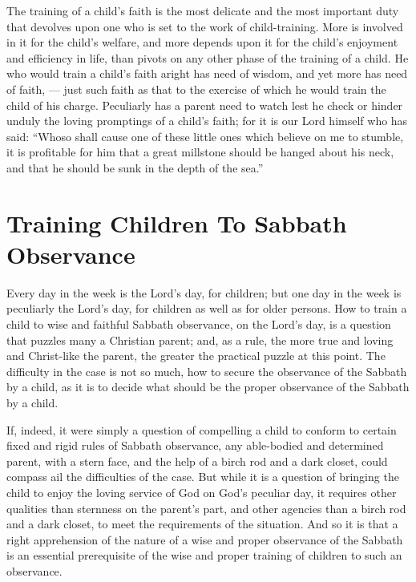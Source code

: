 \documentclass[
]{book}
\begin{document}
The training of a child's faith is the most delicate and the most important duty that devolves upon one who is set to the work of child-training. More is involved in it for the child's welfare, and more depends upon it for the child's enjoyment and efficiency in life, than pivots on any other phase of the training of a child. He who would train a child's faith aright has need of wisdom, and yet more has need of faith, --- just such faith as that to the exercise of which he would train the child of his charge. Peculiarly has a parent need to watch lest he check or hinder unduly the loving promptings of a child's faith; for it is our Lord himself who has said: ``Whoso shall cause one of these little ones which believe on me to stumble, it is profitable for him that a great millstone should be hanged about his neck, and that he should be sunk in the depth of the sea.''

\hypertarget{training-children-to-sabbath-observance}{%
\chapter{Training Children To Sabbath Observance}\label{training-children-to-sabbath-observance}}

Every day in the week is the Lord's day, for children; but one day in the week is peculiarly the Lord's day, for children as well as for older persons. How to train a child to wise and faithful Sabbath observance, on the Lord's day, is a question that puzzles many a Christian parent; and, as a rule, the more true and loving and Christ-like the parent, the greater the practical puzzle at this point. The difficulty in the case is not so much, how to secure the observance of the Sabbath by a child, as it is to decide what should be the proper observance of the Sabbath by a child.

If, indeed, it were simply a question of compelling a child to conform to certain fixed and rigid rules of Sabbath observance, any able-bodied and determined parent, with a stern face, and the help of a birch rod and a dark closet, could compass ail the difficulties of the case. But while it is a question of bringing the child to enjoy the loving service of God on God's peculiar day, it requires other qualities than sternness on the parent's part, and other agencies than a birch rod and a dark closet, to meet the requirements of the situation. And so it is that a right apprehension of the nature of a wise and proper observance of the Sabbath is an essential prerequisite of the wise and proper training of children to such an observance.
\end{document}
